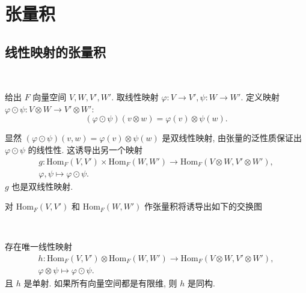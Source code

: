 \section{张量积}

\subsection{线性映射的张量积}

\begin{definition}
    \

    给出 $F$ 向量空间 $V,W,V',W'$. 取线性映射 $\varphi:V \to V', \psi:W \to W'$. 定义映射 $\varphi \odot  \psi: V \otimes W \to V' \otimes W'$:
    \vspace{-1em}
    \begin{equation*}
        (\varphi \odot \psi)(v \otimes w) = \varphi(v) \otimes \psi(w).
    \end{equation*}
\end{definition}

显然 $(\varphi \odot \psi)(v,w) = \varphi(v) \otimes \psi(w)$ 是双线性映射, 由张量的泛性质保证出 $\varphi \odot \psi$ 的线性性. 这诱导出另一个映射
\begin{equation*}
   \begin{matrix}
        g:\text{Hom}_F(V,V') \times \text{Hom}_F(W,W') \to \text{Hom}_F(V \otimes W, V' \otimes W'),\\ 
        \varphi,\psi \mapsto \varphi \odot \psi.
    \end{matrix} 
\end{equation*}
$g$ 也是双线性映射.

对 $\text{Hom}_F(V,V')$ 和 $\text{Hom}_F(W,W')$ 作张量积将诱导出如下的交换图

\begin{center}
\end{center}
\begin{theorem}
  \

  存在唯一线性映射
  \begin{equation*}
    \begin{matrix}
        h:\text{Hom}_F(V,V') \otimes \text{Hom}_F(W,W') \to \text{Hom}_F(V \otimes W, V' \otimes W'),\\ 
        \varphi \otimes \psi \mapsto \varphi \odot \psi.
    \end{matrix} 
\end{equation*}
且 $h$ 是单射. 如果所有向量空间都是有限维, 则 $h$ 是同构.
\end{theorem}

